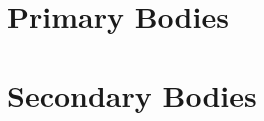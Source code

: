 
\section{Primary Bodies} %
\label{sec:primary_bodies}




\section{Secondary Bodies} %
\label{sec:secondary_bodies}




